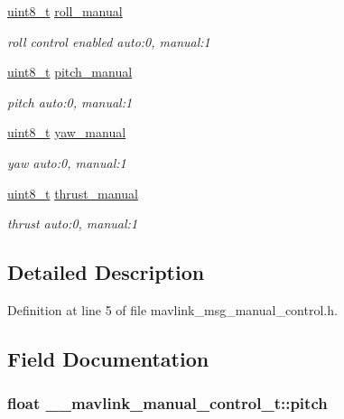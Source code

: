 \begin{DoxyCompactItemize}
\hyperlink{stdint_8h_aba7bc1797add20fe3efdf37ced1182c5}{uint8\-\_\-t} \hyperlink{struct____mavlink__manual__control__t_ab4a150b1bae53e055a2765476588c959}{roll\-\_\-manual}
\begin{DoxyCompactList}\small\item\em roll control enabled auto\-:0, manual\-:1 \end{DoxyCompactList}\item 
\hyperlink{stdint_8h_aba7bc1797add20fe3efdf37ced1182c5}{uint8\-\_\-t} \hyperlink{struct____mavlink__manual__control__t_a64ad2133cc5e9f75044419f1253a1168}{pitch\-\_\-manual}
\begin{DoxyCompactList}\small\item\em pitch auto\-:0, manual\-:1 \end{DoxyCompactList}\item 
\hyperlink{stdint_8h_aba7bc1797add20fe3efdf37ced1182c5}{uint8\-\_\-t} \hyperlink{struct____mavlink__manual__control__t_a79127e569fdb1e9245f5546aac2a4346}{yaw\-\_\-manual}
\begin{DoxyCompactList}\small\item\em yaw auto\-:0, manual\-:1 \end{DoxyCompactList}\item 
\hyperlink{stdint_8h_aba7bc1797add20fe3efdf37ced1182c5}{uint8\-\_\-t} \hyperlink{struct____mavlink__manual__control__t_a5c4e15946d0218be1f6cd7a7a01fde70}{thrust\-\_\-manual}
\begin{DoxyCompactList}\small\item\em thrust auto\-:0, manual\-:1 \end{DoxyCompactList}\end{DoxyCompactItemize}


\subsection{Detailed Description}


Definition at line 5 of file mavlink\-\_\-msg\-\_\-manual\-\_\-control.\-h.



\subsection{Field Documentation}
\hypertarget{struct____mavlink__manual__control__t_a12e31b9bd5f10ac7671a42a14dbb732d}{
\subsubsection[{pitch}]{\setlength{\rightskip}{0pt plus 5cm}float \-\_\-\-\_\-mavlink\-\_\-manual\-\_\-control\-\_\-t\-::pitch}}\label{struct____mavlink__manual__control__t_a12e31b9bd5f10ac7671a42a14dbb732d}


